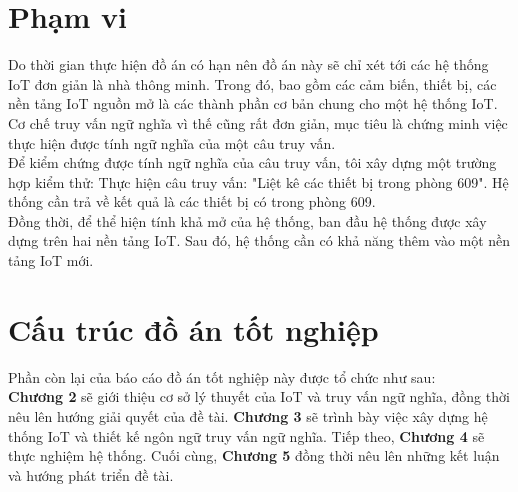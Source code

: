 \section{Phạm vi}
Do thời gian thực hiện đồ án có hạn nên đồ án này sẽ chỉ xét tới các hệ thống IoT đơn giản là nhà thông minh. Trong đó, bao gồm các cảm biến, thiết bị, các nền tảng IoT nguồn mở là các thành phần cơ bản chung cho một hệ thống IoT. Cơ chế truy vấn ngữ nghĩa vì thế cũng rất đơn giản, mục tiêu là chứng minh việc thực hiện được tính ngữ nghĩa của một câu truy vấn.\\
Để kiểm chứng được tính ngữ nghĩa của câu truy vấn, tôi xây dựng một trường hợp kiểm thử:
Thực hiện câu truy vấn: "Liệt kê các thiết bị trong phòng 609". Hệ thống cần trả về kết quả là các thiết bị có trong phòng 609. \\
Đồng thời, để thể hiện tính khả mở của hệ thống, ban đầu hệ thống được xây dựng trên hai nền tảng IoT. Sau đó, hệ thống cần có khả năng thêm vào một nền tảng IoT mới.


\section{Cấu trúc đồ án tốt nghiệp}
Phần còn lại của báo cáo đồ án tốt nghiệp này được tổ chức như sau:\\
\textbf{Chương 2} sẽ giới thiệu cơ sở lý thuyết của IoT và truy vấn ngữ nghĩa, đồng thời nêu lên hướng giải quyết của đề tài. \textbf{Chương 3} sẽ trình bày việc xây dựng hệ thống IoT và thiết kế ngôn ngữ truy vấn ngữ nghĩa. Tiếp theo, \textbf{Chương 4} sẽ thực nghiệm hệ thống. Cuối cùng, \textbf{Chương 5} đồng thời nêu lên những kết luận và hướng phát triển đề tài.
 
